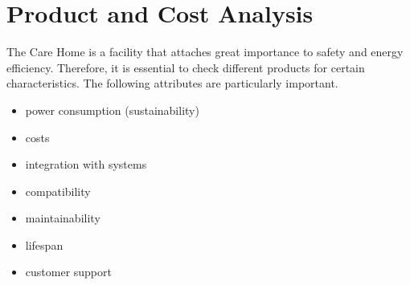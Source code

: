 \chapter{Product and Cost Analysis}
\label{market-analysis}
The Care Home is a facility that attaches great importance to safety and energy efficiency. Therefore, it is essential to check different products for certain characteristics. The following attributes are particularly important.
\begin{itemize}
	\item power consumption (sustainability)
	\item costs
	\item integration with systems
	\item compatibility
	\item maintainability
	\item lifespan
	\item customer support 
\end{itemize}


